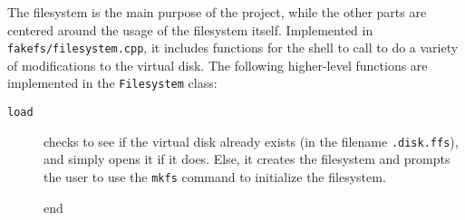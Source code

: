 \documentclass[twoside]{article}
\begin{document}
\begin{multicols}{2}
The filesystem is the main purpose of the project, while the other parts are
centered around the usage of the filesystem itself. Implemented in
\texttt{fakefs/filesystem.cpp}, it includes functions for the shell to call to
do a variety of modifications to the virtual disk. The following higher-level
functions are implemented in the \texttt{Filesystem} class:

\begin{description}
  \item[\texttt{load}] checks to see if the virtual disk already exists (in the
    filename \texttt{.disk.ffs}), and simply opens it if it does. Else, it
    creates the filesystem and prompts the user to use the \texttt{mkfs} command
    to initialize the filesystem.
  \item[\texttt{}] end
\end{description}


\end{multicols}
\end{document}
